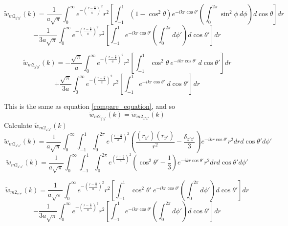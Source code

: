 \documentclass[double,12pt]{beavtex}
\begin{document}
\begin{displaymath}{\widetilde{w}_{{m2}_{y'y'}}(k)=\frac{1}{a\sqrt{\pi}}\int_{0}^{\infty}e^{-\left(\frac{r-\frac{\alpha}{2}}{a}\right)^2}r^2\left[\int_{-1}^{1}\left(1-\cos^2\theta\right)e^{-ikr\cos\theta'}\left(\int_{0}^{2\pi}\sin^2\phi~d{\phi}\right)d{\cos\theta}\right]d{r}}\end{displaymath} 
\begin{equation}{-\frac{1}{3a\sqrt{\pi}}\int_{0}^{\infty}e^{-\left(\frac{r-\frac{\alpha}{2}}{a}\right)^2}r^2\left[\int_{-1}^{1}e^{-ikr\cos\theta'}\left(\int_{0}^{2\pi}d{\phi'}\right)d{\cos\theta'}\right]d{r}}\end{equation}


\begin{displaymath}{\widetilde{w}_{{m2}_{y'y'}}(k)=-\frac{\sqrt{\pi}}{a}\int_{0}^{\infty}e^{-\left(\frac{r-\frac{\alpha}{2}}{a}\right)^2}r^2\left[\int_{-1}^{1}\cos^2\theta~e^{-ikr\cos\theta'}~d{\cos\theta'}\right]d{r}}\end{displaymath} 
\begin{equation}{+\frac{\sqrt{\pi}}{3a}\int_{0}^{\infty}e^{-\left(\frac{r-\frac{\alpha}{2}}{a}\right)^2}r^2\left[\int_{-1}^{1}e^{-ikr\cos\theta'}~d{\cos\theta'}\right]d{r}}\end{equation}

This is the same as equation \ref{compare_equation}, and so \begin{equation}{\widetilde{w}_{{m2}_{y'y'}}(k)=\widetilde{w}_{{m2}_{x'x'}}(k)}\end{equation}
Calculate $\widetilde{w}_{{m2}_{z'z'}}(k)$ 
\begin{equation}{\widetilde{w}_{{m2}_{z'z'}}(k)=\frac{1}{a\sqrt{\pi}}\int_{0}^{\infty}\int_{-1}^{1}\int_{0}^{2\pi}e^{\left(\frac{r-\frac{\alpha}{2}}{a}\right)^2}\left(\frac{(r_{y'})(r_{y'})}{r^2}-\frac{\delta_{z'z'}}{3}\right)e^{-ikr\cos\theta'}r^2d{r}d{\cos\theta'}d{\phi'}}\end{equation}
\begin{equation}{\widetilde{w}_{{m2}_{z'z'}}(k)=\frac{1}{a\sqrt{\pi}}\int_{0}^{\infty}\int_{-1}^{1}\int_{0}^{2\pi}e^{\left(\frac{r-\frac{\alpha}{2}}{a}\right)^2}\left(\cos^2\theta'-\frac{1}{3}\right)e^{-ikr\cos\theta'}r^2d{r}d{\cos\theta'}d{\phi'}}\end{equation}

\begin{displaymath}{\widetilde{w}_{{m2}_{z'z'}}(k)=\frac{1}{a\sqrt{\pi}}\int_{0}^{\infty}e^{-\left(\frac{r-\frac{\alpha}{2}}{a}\right)^2}r^2\left[\int_{-1}^{1}\cos^2\theta'~e^{-ikr\cos\theta'}\left(\int_{0}^{2\pi}d{\phi'}\right)d{\cos\theta'}\right]d{r}}\end{displaymath} 
\begin{equation}{-\frac{1}{3a\sqrt{\pi}}\int_{0}^{\infty}e^{-\left(\frac{r-\frac{\alpha}{2}}{a}\right)^2}r^2\left[\int_{-1}^{1}e^{-ikr\cos\theta'}\left(\int_{0}^{2\pi}d{\phi'}\right)d{\cos\theta'}\right]d{r}}\end{equation}
\end{document}
